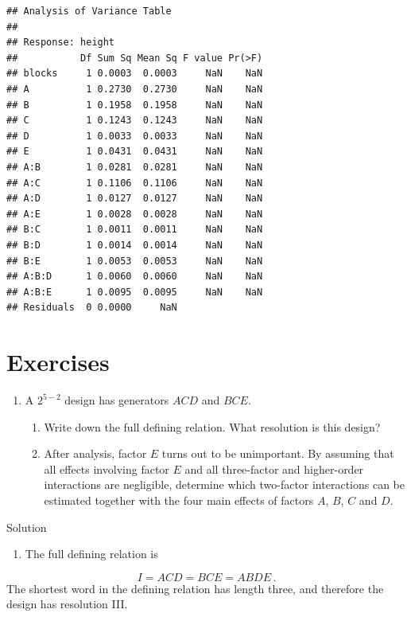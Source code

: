 \documentclass[
]{book}
\providecommand{\tightlist}{%
  \setlength{\itemsep}{0pt}\setlength{\parskip}{0pt}}
\theoremstyle{definition}
\theoremstyle{definition}
\theoremstyle{definition}
\theoremstyle{definition}
\theoremstyle{remark}
\begin{document}
\begin{verbatim}
## Analysis of Variance Table
## 
## Response: height
##           Df Sum Sq Mean Sq F value Pr(>F)
## blocks     1 0.0003  0.0003     NaN    NaN
## A          1 0.2730  0.2730     NaN    NaN
## B          1 0.1958  0.1958     NaN    NaN
## C          1 0.1243  0.1243     NaN    NaN
## D          1 0.0033  0.0033     NaN    NaN
## E          1 0.0431  0.0431     NaN    NaN
## A:B        1 0.0281  0.0281     NaN    NaN
## A:C        1 0.1106  0.1106     NaN    NaN
## A:D        1 0.0127  0.0127     NaN    NaN
## A:E        1 0.0028  0.0028     NaN    NaN
## B:C        1 0.0011  0.0011     NaN    NaN
## B:D        1 0.0014  0.0014     NaN    NaN
## B:E        1 0.0053  0.0053     NaN    NaN
## A:B:D      1 0.0060  0.0060     NaN    NaN
## A:B:E      1 0.0095  0.0095     NaN    NaN
## Residuals  0 0.0000     NaN
\end{verbatim}

\hypertarget{exercises-5}{%
\section{Exercises}\label{exercises-5}}

\begin{enumerate}
\def\labelenumi{\arabic{enumi}.}
\item
  A \(2^{5-2}\) design has generators \(ACD\) and \(BCE\).

  \begin{enumerate}
  \def\labelenumii{\alph{enumii}.}
  \item
    Write down the full defining relation. What resolution is this design?
  \item
    After analysis, factor \(E\) turns out to be unimportant. By assuming that all effects involving factor \(E\) and all three-factor and higher-order interactions are negligible, determine which two-factor interactions can be estimated together with the four main effects of factors \(A\), \(B\), \(C\) and \(D\).
  \end{enumerate}
\end{enumerate}

Solution

\begin{enumerate}
\def\labelenumi{\alph{enumi}.}
\tightlist
\item
  The full defining relation is
\end{enumerate}

\[
I = ACD = BCE = ABDE\,.
\]
The shortest word in the defining relation has length three, and therefore the design has resolution III.
\end{document}
